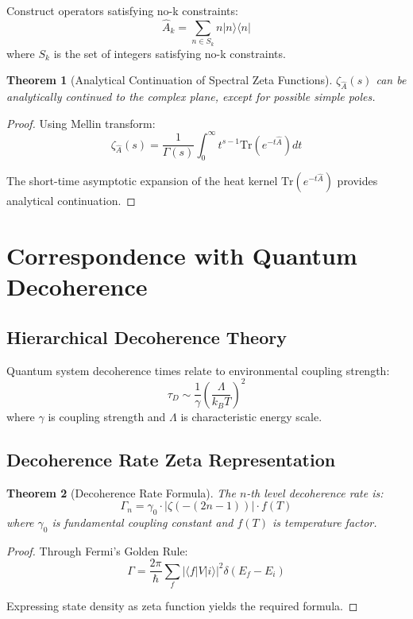 \documentclass[12pt]{article}
\newtheorem{theorem}{Theorem}[section]
\begin{document}
Construct operators satisfying no-k constraints:
$$\hat{A}_k = \sum_{n \in S_k} n |n\rangle \langle n|$$
where $S_k$ is the set of integers satisfying no-k constraints.

\begin{theorem}[Analytical Continuation of Spectral Zeta Functions]
$\zeta_{\hat{A}}(s)$ can be analytically continued to the complex plane, except for possible simple poles.
\end{theorem}

\begin{proof}
Using Mellin transform:
$$\zeta_{\hat{A}}(s) = \frac{1}{\Gamma(s)} \int_0^{\infty} t^{s-1} \text{Tr}(e^{-t\hat{A}}) dt$$

The short-time asymptotic expansion of the heat kernel $\text{Tr}(e^{-t\hat{A}})$ provides analytical continuation.
\end{proof}

\section{Correspondence with Quantum Decoherence}

\subsection{Hierarchical Decoherence Theory}

Quantum system decoherence times relate to environmental coupling strength:
$$\tau_D \sim \frac{1}{\gamma} \left(\frac{\Lambda}{k_B T}\right)^2$$
where $\gamma$ is coupling strength and $\Lambda$ is characteristic energy scale.

\subsection{Decoherence Rate Zeta Representation}

\begin{theorem}[Decoherence Rate Formula]
The $n$-th level decoherence rate is:
$$\Gamma_n = \gamma_0 \cdot |\zeta(-(2n-1))| \cdot f(T)$$
where $\gamma_0$ is fundamental coupling constant and $f(T)$ is temperature factor.
\end{theorem}

\begin{proof}
Through Fermi's Golden Rule:
$$\Gamma = \frac{2\pi}{\hbar} \sum_{f} |\langle f|V|i\rangle|^2 \delta(E_f - E_i)$$

Expressing state density as zeta function yields the required formula.
\end{proof}
\end{document}

